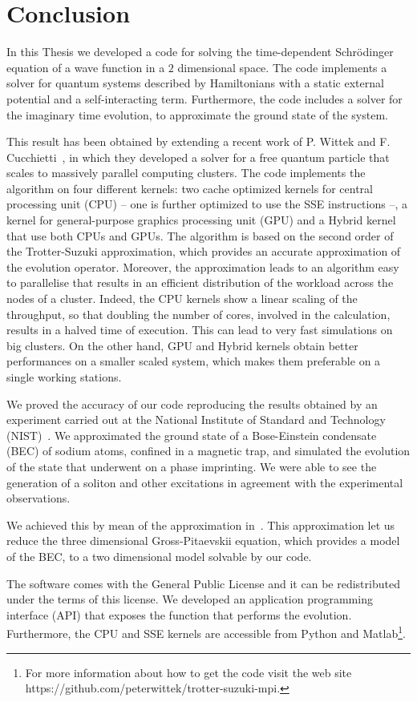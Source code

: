 \chapter{Conclusion}
In this Thesis we developed a code for solving the time-dependent Schr\"odinger equation of a wave function in a $2$ dimensional space. The code implements a solver for quantum systems described by Hamiltonians with a static external potential and a self-interacting term. Furthermore, the code includes a solver for the imaginary time evolution, to approximate the ground state of the system.

This result has been obtained by extending  a recent work of P. Wittek and F. Cucchietti~\citep{Wittek20131165}, in which they developed a solver for a free quantum particle that scales to massively parallel computing clusters. The code implements the algorithm on four different kernels: two cache optimized kernels for central processing unit (CPU) -- one is further optimized to use the SSE instructions --, a kernel for general-purpose graphics processing unit (GPU) and a Hybrid kernel that use both CPUs and GPUs. The algorithm is based on the second order of the Trotter-Suzuki approximation, which provides an accurate approximation of the evolution operator. Moreover, the approximation leads to an algorithm easy to parallelise that results in an efficient distribution of the workload across the nodes of a cluster. Indeed, the CPU kernels show a linear scaling of the throughput, so that doubling the number of cores, involved in the calculation, results in a halved time of execution. This can lead to very fast simulations on big clusters. On the other hand, GPU and Hybrid kernels obtain better performances on a smaller scaled system, which makes them preferable on a single working stations.

We proved the accuracy of our code reproducing the results obtained by an experiment carried out at the National Institute of Standard and Technology (NIST)~\citep{DSF00}. We approximated the ground state of a Bose-Einstein condensate (BEC) of sodium atoms, confined in a magnetic trap, and simulated the evolution of the state that underwent on a phase imprinting. We were able to see the generation of a soliton and other excitations in agreement with the experimental observations.

We achieved this by mean of the approximation in~\citep{PietroMassignan}. This approximation let us reduce the three dimensional Gross-Pitaevskii equation, which provides a model of the BEC, to a two dimensional model solvable by our code.

The software comes with the General Public License and it can be redistributed under the terms of this license. We developed an application programming interface (API) that exposes the function that performs the evolution. Furthermore, the CPU and SSE kernels are accessible from Python and Matlab\footnote{For more information about how to get the code visit the web site https://github.com/peterwittek/trotter-suzuki-mpi.}.

